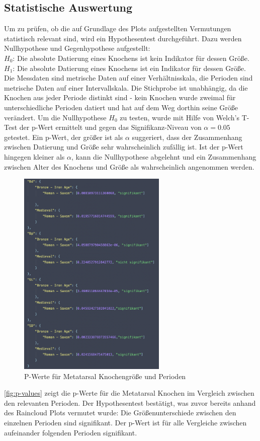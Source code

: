 \subsection{Statistische Auswertung}
Um zu prüfen, ob die auf Grundlage des Plots aufgestellten Vermutungen statistisch relevant sind, wird ein Hypothesentest durchgeführt. 
Dazu werden Nullhypothese und Gegenhypothese aufgestellt: \\
$H_0$: Die absolute Datierung eines Knochens ist kein Indikator für dessen Größe.\\
$H_1$: Die absolute Datierung eines Knochens ist ein Indikator für dessen Größe.\\

Die Messdaten sind metrische Daten auf einer Verhältnisskala, die Perioden sind metrische Daten auf einer Intervallskala. 
Die Stichprobe ist unabhängig, da die Knochen aus jeder Periode distinkt sind - kein Knochen wurde zweimal für unterschiedliche Perioden datiert und hat auf dem Weg dorthin seine Größe verändert.
Um die Nullhypothese $H_0$ zu testen, wurde mit Hilfe von Welch's T-Test der p-Wert ermittelt und gegen das Signifikanz-Niveau von $\alpha = 0.05$ getestet. 
Ein p-Wert, der größer ist als $\alpha$ suggeriert, dass der Zusammenhang zwischen Datierung und Größe sehr wahrscheinlich zufällig ist. 
Ist der p-Wert hingegen kleiner als $\alpha$, kann die Nullhypothese abgelehnt und ein Zusammenhang zwischen Alter des Knochens und Größe als wahrscheinlich angenommen werden.
\begin{figure}[H]
    \centering
    \includegraphics[height=10cm]{docs/latex/attachments/metatarsal_p-values.png}
    \caption{P-Werte für Metatarsal Knochengröße und Perioden}
    \label{fig:p-values}
\end{figure}

\autoref{fig:p-values} zeigt die p-Werte für die Metatarsal Knochen im Vergleich zwischen den relevanten Perioden.
Der Hypothesentest bestätigt, was zuvor bereits anhand des Raincloud Plots vermutet wurde: Die Größenunterschiede zwischen den einzelnen Perioden sind signifikant.
Der p-Wert ist für alle Vergleiche zwischen aufeinander folgenden Perioden signifikant.